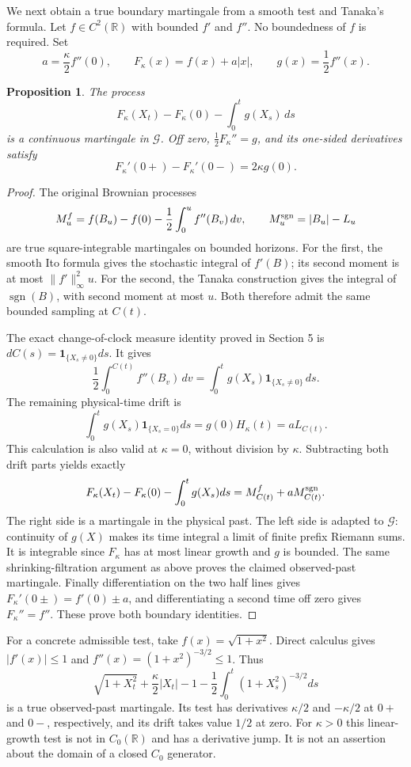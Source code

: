 \documentclass[11pt]{article}
\newtheorem{proposition}[theorem]{Proposition}
\newcommand{\R}{\mathbb R}
\newcommand{\ind}{\mathbf1}
\newcommand{\G}{\mathcal G}
\begin{document}
We next obtain a true boundary martingale from a smooth test and
Tanaka's formula. Let $f\in C^2(\R)$ with bounded $f'$ and $f''$.
No boundedness of $f$ is required. Set
\begin{equation}\label{eq:boundarytest}
 a=\frac\kappa2 f''(0),\qquad
 F_\kappa(x)=f(x)+a|x|,\qquad g(x)=\frac12f''(x).
\end{equation}
\begin{proposition}\label{prop:boundary}
The process
\[
 F_\kappa(X_t)-F_\kappa(0)-\int_0^t g(X_s)\,ds
\]
is a continuous martingale in $\G$. Off zero,
$\tfrac12F_\kappa''=g$, and its one-sided derivatives satisfy
\begin{equation}\label{eq:boundaryjump}
 F_\kappa'(0+)-F_\kappa'(0-)=2\kappa g(0).
\end{equation}
\end{proposition}
\begin{proof}
The original Brownian processes
\[
 M^f_u=f(B_u)-f(0)-\frac12\int_0^u f''(B_v)\,dv,
 \qquad M^{\rm sgn}_u=|B_u|-L_u
\]
are true square-integrable martingales on bounded horizons.
For the first, the smooth Ito formula gives the stochastic integral
of $f'(B)$; its second moment is at most $\|f'\|_\infty^2u$.
For the second, the Tanaka construction gives the integral of
$\operatorname{sgn}(B)$, with second moment at most $u$.
Both therefore admit the same bounded sampling at $C(t)$.

The exact change-of-clock measure identity proved in Section 5 is
$dC(s)=\ind_{\{X_s\ne0\}}ds$. It gives
\[
 \frac12\int_0^{C(t)}f''(B_v)\,dv
   =\int_0^t g(X_s)\ind_{\{X_s\ne0\}}\,ds.
\]
The remaining physical-time drift is
\[
 \int_0^t g(X_s)\ind_{\{X_s=0\}}ds
 =g(0)H_\kappa(t)=aL_{C(t)}.
\]
This calculation is also valid at $\kappa=0$, without division by
$\kappa$. Subtracting both drift parts yields exactly
\[
 F_\kappa(X_t)-F_\kappa(0)-\int_0^t g(X_s)ds
 =M^f_{C(t)}+aM^{\rm sgn}_{C(t)}.
\]
The right side is a martingale in the physical past. The left side
is adapted to $\G$: continuity of $g(X)$ makes its time integral
a limit of finite prefix Riemann sums. It is integrable since
$F_\kappa$ has at most linear growth and $g$ is bounded.
The same shrinking-filtration argument as above proves the claimed
observed-past martingale. Finally differentiation on the two half
lines gives $F_\kappa'(0\pm)=f'(0)\pm a$, and differentiating a
second time off zero gives $F_\kappa''=f''$. These prove both
boundary identities.
\end{proof}

For a concrete admissible test, take $f(x)=\sqrt{1+x^2}$. Direct
calculus gives $|f'(x)|\leq1$ and
$f''(x)=(1+x^2)^{-3/2}\leq1$. Thus
\[
 \sqrt{1+X_t^2}+\frac\kappa2|X_t|-1
 -\frac12\int_0^t(1+X_s^2)^{-3/2}ds
\]
is a true observed-past martingale. Its test has derivatives
$\kappa/2$ and $-\kappa/2$ at $0+$ and $0-$, respectively,
and its drift takes value $1/2$ at zero. For $\kappa>0$ this
linear-growth test is not in $C_0(\R)$ and has a derivative jump.
It is not an assertion about the domain of a closed $C_0$ generator.
\end{document}
